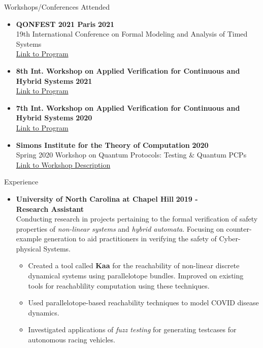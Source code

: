 \documentclass{resume} %
\begin{document}
\begin{rSection}{Workshops/Conferences Attended}
\begin{itemize}[leftmargin=*]
  \item {\bf QONFEST 2021 Paris } \hfill {\bf 2021} \\
  19th International Conference on Formal Modeling and Analysis of Timed Systems \\
  \href{https://qonfest2021.lacl.fr/formats21.php}{Link to Program}

  \item {\bf  8th Int. Workshop on Applied Verification for Continuous and Hybrid Systems} \hfill {\bf 2021} \\
  \href{https://cps-vo.org/group/ARCH/archive}{Link to Program}

  \item {\bf  7th Int. Workshop on Applied Verification for Continuous and Hybrid Systems} \hfill {\bf 2020} \\
  \href{https://cps-vo.org/group/ARCH/archive}{Link to Program}

  \item {\bf Simons Institute for the Theory of Computation} \hfill {\bf 2020} \\
  Spring 2020 Workshop on Quantum Protocols: Testing \& Quantum PCPs \\
  \href{https://simons.berkeley.edu/workshops/quantum-2020-2}{Link to Workshop Description}
\end{itemize}
\end{rSection}


\begin{rSection}{Experience}
  \begin{itemize}[leftmargin=*]
    \item
      {\bf University of North Carolina at Chapel Hill} \hfill {\bf 2019 -} \\
      {\bf Research Assistant} \\
      Conducting research in projects pertaining to the formal verification of safety properties of \emph{non-linear systems} and \emph{hybrid automata}. Focusing on counter-example generation to aid practitioners in verifying the safety of Cyber-physical Systems.
        \begin{itemize}[label=$\blackdiamond$]
            \item Created a tool called {\bf Kaa} for the reachability of non-linear discrete dynamical systems using parallelotope bundles. Improved on existing tools for reachablility computation using these techniques.
            \item Used parallelotope-based reachability techniques to model COVID disease dynamics.
            \item Investigated applications of \emph{fuzz testing} for generating testcases for autonomous racing vehicles.
        \end{itemize}
  \end{itemize}
\end{rSection}
\end{document}
